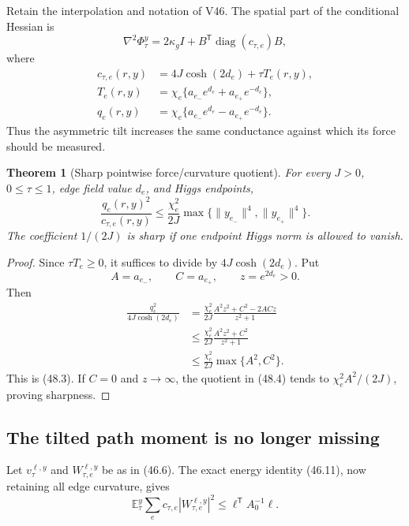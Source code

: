 \documentclass[11pt]{article}
\newtheorem{theorem}{Theorem}[section]
\theoremstyle{remark}
\begin{document}
Retain the interpolation and notation of V46.  The spatial part of
the conditional Hessian is
\[
 \nabla^2\Phi_\tau^y
 =
 2\kappa_gI+
 B^{\mathsf T}\operatorname{diag}(c_{\tau,e})B,    \tag{48.1}
\]
where
\[
\begin{aligned}
 c_{\tau,e}(r,y)
 &=
 4J\cosh(2d_e)+\tau T_e(r,y),\\
 T_e(r,y)
 &=
 \chi_e\{a_{e_-}e^{d_e}+a_{e_+}e^{-d_e}\},\\
 q_e(r,y)
 &=
 \chi_e\{a_{e_-}e^{d_e}-a_{e_+}e^{-d_e}\}.        \tag{48.2}
\end{aligned}
\]
Thus the asymmetric tilt increases the same conductance against which
its force should be measured.

\begin{theorem}[Sharp pointwise force/curvature quotient]
\label{thm:v17v48-quotient}
For every \(J>0\), \(0\leq\tau\leq1\), edge field value \(d_e\), and
Higgs endpoints,
\[
\boxed{
 \frac{q_e(r,y)^2}{c_{\tau,e}(r,y)}
 \leq
 \frac{\chi_e^2}{2J}
 \max\{\|y_{e_-}\|^4,\|y_{e_+}\|^4\}.}            \tag{48.3}
\]
The coefficient \(1/(2J)\) is sharp if one endpoint Higgs norm is
allowed to vanish.
\end{theorem}

\begin{proof}
Since \(\tau T_e\geq0\), it suffices to divide by
\(4J\cosh(2d_e)\).  Put
\[
 A=a_{e_-},\qquad C=a_{e_+},\qquad z=e^{2d_e}>0.
\]
Then
\[
\begin{aligned}
 \frac{q_e^2}{4J\cosh(2d_e)}
 &=
 \frac{\chi_e^2}{2J}
 \frac{A^2z^2+C^2-2ACz}{z^2+1}\\
 &\leq
 \frac{\chi_e^2}{2J}
 \frac{A^2z^2+C^2}{z^2+1}\\
 &\leq
 \frac{\chi_e^2}{2J}\max\{A^2,C^2\}.              \tag{48.4}
\end{aligned}
\]
This is (48.3).  If \(C=0\) and \(z\to\infty\), the quotient in
(48.4) tends to \(\chi_e^2A^2/(2J)\), proving sharpness.
\end{proof}

\subsection{The tilted path moment is no longer missing}

Let \(v_\tau^{\ell,y}\) and
\(W_{\tau,e}^{\ell,y}\) be as in (46.6).  The exact energy identity
(46.11), now retaining all edge curvature, gives
\[
 \mathbb E_\tau^y
 \sum_ec_{\tau,e}|W_{\tau,e}^{\ell,y}|^2
 \leq
 \ell^{\mathsf T}A_0^{-1}\ell.                    \tag{48.5}
\]
\end{document}
